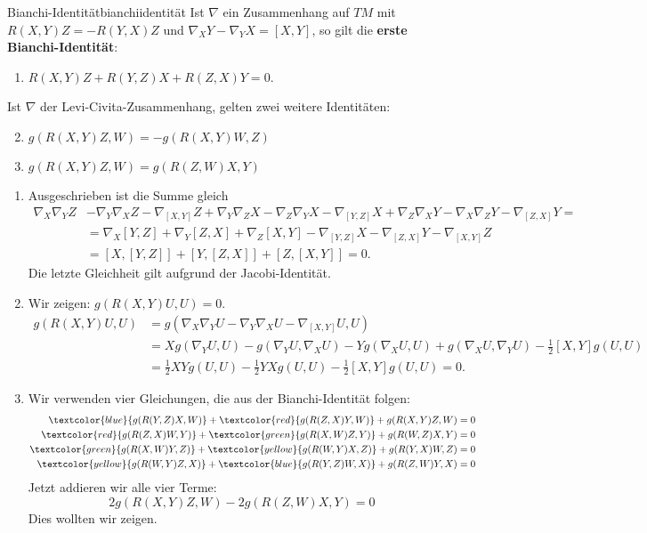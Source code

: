 \begin{satz}{Bianchi-Identität}{bianchiidentität}
Ist $\nabla$ ein Zusammenhang auf $TM$ mit $R(X,Y)Z=-R(Y,X)Z$ und $\nabla_XY-\nabla_YX=[X,Y]$, so gilt die \textbf{erste Bianchi-Identität}:
\begin{enumerate}
\item $R(X,Y)Z+R(Y,Z)X+R(Z,X)Y=0$.
\end{enumerate}
Ist $\nabla$ der Levi-Civita-Zusammenhang, gelten zwei weitere Identitäten:
\begin{enumerate}
\setcounter{enumi}{1}
\item $g(R(X,Y)Z,W)=-g(R(X,Y)W,Z)$
\item $g(R(X,Y)Z,W)=g(R(Z,W)X,Y)$
\end{enumerate}
\end{satz}
\begin{beweis}
\begin{enumerate}
\item
Ausgeschrieben ist die Summe gleich 
\begin{align}
\nabla_X\nabla_YZ &-\nabla_Y\nabla_XZ-\nabla_{[X,Y]}Z + \nabla_Y\nabla_ZX-\nabla_Z\nabla_YX-\nabla_{[Y,Z]}X+\nabla_Z\nabla_XY-\nabla_X\nabla_ZY-\nabla_{[Z,X]}Y = \\
&=\nabla_X[Y,Z]+\nabla_Y[Z,X]+\nabla_Z[X,Y]-\nabla_{[Y,Z]}X-\nabla_{[Z,X]}Y-\nabla_{[X,Y]}Z \\
&= [X, [Y,Z]]+[Y,[Z,X]]+[Z,[X,Y]] = 0.
\end{align}
Die letzte Gleichheit gilt aufgrund der Jacobi-Identität.
\item 
Wir zeigen: $g(R(X,Y)U,U)=0$.
\begin{align}
g(R(X,Y)U,U)&=g(\nabla_X\nabla_YU-\nabla_Y\nabla_XU-\nabla_{[X,Y]}U,U)\\
&=Xg(\nabla_YU,U)-g(\nabla_YU,\nabla_XU)-Yg(\nabla_XU,U)+g(\nabla_XU,\nabla_YU)-\frac{1}{2}[X,Y]g(U,U)\\
&=\frac{1}{2}XYg(U,U)-\frac{1}{2}YXg(U,U)-\frac{1}{2}[X,Y]g(U,U)=0.
\end{align}
\item Wir verwenden vier Gleichungen, die aus der Bianchi-Identität folgen:
\begin{align}
\textcolor{blue}{g(R(Y,Z)X,W)}+\textcolor{red}{g(R(Z,X)Y,W)}+g(R(X,Y)Z,W)&=0\\
\textcolor{red}{g(R(Z,X)W,Y)}+\textcolor{green}{g(R(X,W)Z,Y)}+g(R(W,Z)X,Y)&=0\\
\textcolor{green}{g(R(X,W)Y,Z)}+\textcolor{yellow}{g(R(W,Y)X,Z)}+g(R(Y,X)W,Z)&=0\\
\textcolor{yellow}{g(R(W,Y)Z,X)}+\textcolor{blue}{g(R(Y,Z)W,X)}+g(R(Z,W)Y,X)&=0
\end{align}
Jetzt addieren wir alle vier Terme:
\begin{equation}
2g(R(X,Y)Z,W)-2g(R(Z,W)X,Y)=0
\end{equation}
Dies wollten wir zeigen.
\end{enumerate}
\end{beweis}
